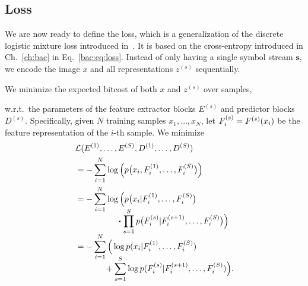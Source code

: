 \subsection{Loss}

We are now ready to define the loss, which is a generalization of the discrete logistic mixture loss introduced in~\cite{Salimans2017pcnnpp}. 
It is based on the cross-entropy introduced in Ch.~\ref{ch:bac} in Eq.~\ref{bac:eq:loss}. Instead of only having a single symbol stream $\bm s$, we encode the image $x$ and all representations $z^{(s)}$ sequentially. 

We minimize the expected bitcost of both $x$ and $z^{(s)}$ over samples, 


w.r.t.\ the parameters of the feature extractor blocks
$E^{(s)}$ and predictor blocks $D^{(s)}$. Specifically, given $N$ training samples $x_1, \dots, x_N$, let $F^{(s)}_i = F^{(s)}(x_i)$ be the feature representation of the $i$-th sample.
We minimize
\begin{align}
    &\mathcal L(E^{(1)}, \ldots, E^{(S)}, D^{(1)}, \ldots, D^{(S)}) \nonumber\\
    &=-\sum_{i=1}^N \log 
        \Big(
            p\big(x_i, F^{(1)}_i, \ldots, F^{(S)}_i\big)
        \Big) \nonumber\\
    &=-\sum_{i=1}^N \log 
        \Big(
            p\big(x_i|F^{(1)}_i, \ldots, F^{(S)}_i\big) \nonumber\\[-2ex]
    &\hspace{5em} 
                  \boldsymbol{\cdot} \prod_{s=1}^{S} p
                              \big(F^{(s)}_i|F^{(s+1)}_i, \ldots, F^{(S)}_i\big) 
        \Big) \nonumber\\[-1ex]
     &=-\sum_{i=1}^N \Big(\log p(x_i|F^{(1)}_i, \ldots, F^{(S)}_i) \nonumber\\[-2ex]
     & \hspace{3.5em}+ \sum_{s=1}^{S}\log p(F^{(s)}_i|F^{(s+1)}_i, \ldots, F^{(S)}_i)\Big)\label{l3c:eq:coding_cost}.
\end{align}

